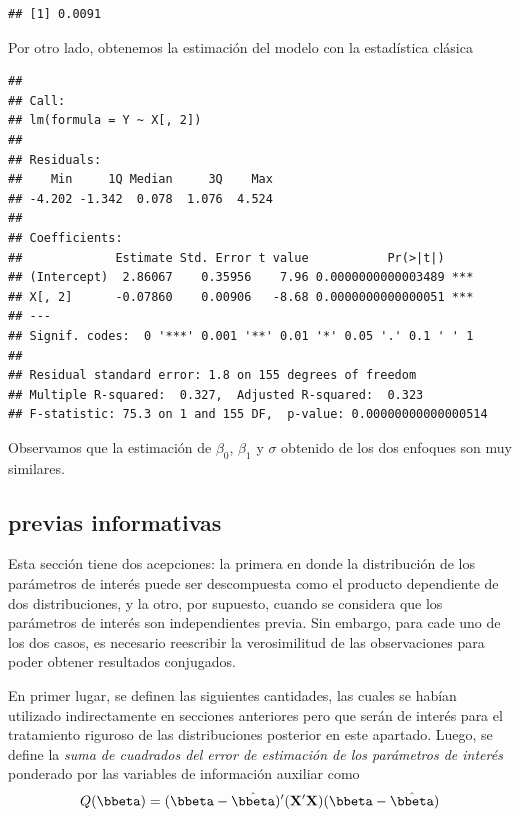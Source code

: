 \begin{Eje}
\begin{knitrout}
\begin{kframe}
\begin{alltt}
\hlstd{(beta.res[,}\hlstd{])}
\end{alltt}
\begin{verbatim}
## [1] 0.0091
\end{verbatim}
\end{kframe}
\end{knitrout}
Por otro lado, obtenemos la estimación del modelo con la estadística clásica
\begin{knitrout}
\color{fgcolor}\begin{kframe}
\begin{alltt}
\hlstd{(} \hlopt{~} \hlstd{X[,}\hlstd{]))}
\end{alltt}
\begin{verbatim}
## 
## Call:
## lm(formula = Y ~ X[, 2])
## 
## Residuals:
##    Min     1Q Median     3Q    Max 
## -4.202 -1.342  0.078  1.076  4.524 
## 
## Coefficients:
##             Estimate Std. Error t value           Pr(>|t|)    
## (Intercept)  2.86067    0.35956    7.96 0.0000000000003489 ***
## X[, 2]      -0.07860    0.00906   -8.68 0.0000000000000051 ***
## ---
## Signif. codes:  0 '***' 0.001 '**' 0.01 '*' 0.05 '.' 0.1 ' ' 1
## 
## Residual standard error: 1.8 on 155 degrees of freedom
## Multiple R-squared:  0.327,	Adjusted R-squared:  0.323 
## F-statistic: 75.3 on 1 and 155 DF,  p-value: 0.00000000000000514
\end{verbatim}
\end{kframe}
\end{knitrout}
Observamos que la estimación de $\beta_0$, $\beta_1$ y $\sigma$ obtenido de los dos enfoques son muy similares.
\end{Eje}

\subsection{previas informativas}

Esta sección tiene dos acepciones: la primera en donde la distribución de los parámetros de interés puede ser descompuesta como el producto dependiente de dos distribuciones, y la otro, por supuesto, cuando se considera que los parámetros de interés son independientes previa. Sin embargo, para cade uno de los dos casos, es necesario reescribir la verosimilitud de las observaciones para poder obtener resultados conjugados.

En primer lugar, se definen las siguientes cantidades, las cuales se habían utilizado indirectamente en secciones anteriores pero que serán de interés para el tratamiento riguroso de las distribuciones posterior en este apartado. Luego, se define la \emph{suma de cuadrados del error de estimación de los parámetros de interés} ponderado por las variables de información auxiliar como
\begin{equation}
Q(\bbeta)=(\bbeta-\hat{\bbeta})'(\mathbf{X}'\mathbf{X})(\bbeta-\hat{\bbeta})
\end{equation}

